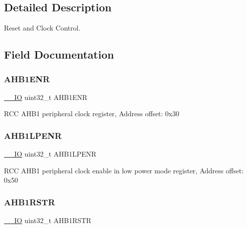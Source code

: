 \subsection{Detailed Description}
Reset and Clock Control. 

\subsection{Field Documentation}
\mbox{\label{struct_r_c_c___type_def_a1e9c75b06c99d0611535f38c7b4aa845}} 
\subsubsection{\texorpdfstring{A\+H\+B1\+E\+NR}{AHB1ENR}}
{\footnotesize\ttfamily \mbox{\hyperlink{core__sc300_8h_aec43007d9998a0a0e01faede4133d6be}{\+\_\+\+\_\+\+IO}} uint32\+\_\+t A\+H\+B1\+E\+NR}

R\+CC A\+H\+B1 peripheral clock register, Address offset\+: 0x30 \mbox{\label{struct_r_c_c___type_def_aae70b1922167eb58d564cb82d39fd10b}} 
\subsubsection{\texorpdfstring{A\+H\+B1\+L\+P\+E\+NR}{AHB1LPENR}}
{\footnotesize\ttfamily \mbox{\hyperlink{core__sc300_8h_aec43007d9998a0a0e01faede4133d6be}{\+\_\+\+\_\+\+IO}} uint32\+\_\+t A\+H\+B1\+L\+P\+E\+NR}

R\+CC A\+H\+B1 peripheral clock enable in low power mode register, Address offset\+: 0x50 \mbox{\label{struct_r_c_c___type_def_a46c20c598e9e12f919f0ea47ebcbc90f}} 
\subsubsection{\texorpdfstring{A\+H\+B1\+R\+S\+TR}{AHB1RSTR}}
{\footnotesize\ttfamily \mbox{\hyperlink{core__sc300_8h_aec43007d9998a0a0e01faede4133d6be}{\+\_\+\+\_\+\+IO}} uint32\+\_\+t A\+H\+B1\+R\+S\+TR}

